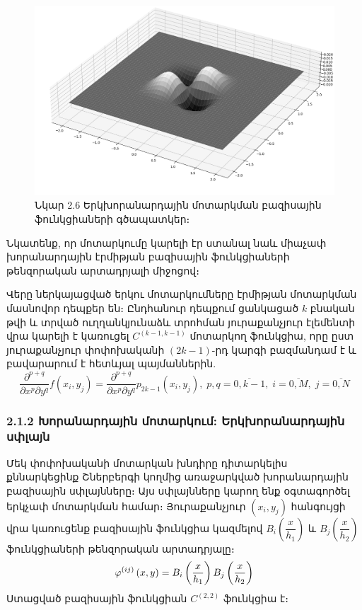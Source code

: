 \documentclass[fleqn, bachelor,subf,12pt,notitlepage]{article}
\begin{document}
\begin{figure}[H]
\begin{minipage}[b]{0.45\textwidth}
  \end{minipage}
\hfill
  \begin{minipage}[b]{0.45\textwidth}
    \includegraphics[width=\textwidth]{images/two_dimensional_ermite_4}
  \end{minipage}
\captionsetup{labelformat=empty}
\caption{Նկար 2.6 Երկխորանարդային մոտարկման բազիսային ֆունկցիաների գծապատկեր։}
\end{figure}
Նկատենք, որ մոտարկումը կարելի էր ստանալ նաև միաչափ խորանարդային էրմիթյան բազիսային ֆունկցիաների թենզորական արտադրյալի միջոցով։

Վերը ներկայացված երկու մոտարկումները էրմիթյան մոտարկման մասնովոր դեպքեր են։
Ընդհանուր դեպքում ցանկացած $k$ բնական թվի և տրված ուղղանկյունաձև տրոհման յուրաքանչյուր էլեմենտի վրա կարելի է կառուցել $C^{\left(k-1, k-1\right)}$ մոտարկող ֆունկցիա, որը ըստ յուրաքանչյուր փոփոխականի $\left(2k-1\right)$-րդ կարգի բազմանդամ է և բավարարում է հետևյալ պայմաններին.
\begin{equation}
\dfrac{\partial^{p+q}}{\partial x^{p} \partial y^{q}}f\left(x_{i}, y_{j}\right)=\dfrac{\partial^{p+q}}{\partial x^{p} \partial y^{q}}p_{2k-1}\left(x_{i}, y_{j}\right), \; p,q=\overline{0, k-1}, \;  i=\overline{0, M}, \; j=\overline{0, N}
\end{equation}

\newpage
\subsubsection*{{2.1.2 Խորանարդային մոտարկում: Երկխորանարդային սփլայն}}

Մեկ փոփոխականի մոտարկան խնդիրը դիտարկելիս քննարկեցինք Շներբերգի կողմից առաջարկված խորանարդային բազիսային սփլայնները։ Այս սփլայնները կարող ենք  օգտագործել երկչափ մոտարկման համար։
Յուրաքանչյուր $\left(x_{i}, y_{j}\right)$ հանգույցի վրա կառուցենք բազիսային ֆունկցիա կազմելով $B_{i}\left(\dfrac{x}{h_{1}}\right)$ և $B_{j}\left(\dfrac{x}{h_{2}}\right)$ ֆունկցիաների թենզորական  արտադրյալը։
\begin{equation}
\varphi^{(ij)}\left(x, y\right) = B_{i}\left(\dfrac{x}{h_{1}}\right) B_{j}\left(\dfrac{x}{h_{2}}\right)$$
\end{equation}
Ստացված բազիսային ֆունկցիան $C^{(2, 2)}$ ֆունկցիա է։
\end{document}
